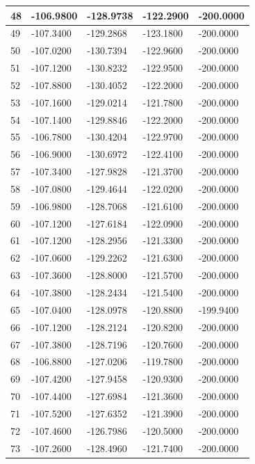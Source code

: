 \begin{longtable}{|l|l|l|l|l|}
48 & -106.9800 & -128.9738 & -122.2900 & -200.0000 \\\hline
49 & -107.3400 & -129.2868 & -123.1800 & -200.0000 \\\hline
50 & -107.0200 & -130.7394 & -122.9600 & -200.0000 \\\hline
51 & -107.1200 & -130.8232 & -122.9500 & -200.0000 \\\hline
52 & -107.8800 & -130.4052 & -122.2000 & -200.0000 \\\hline
53 & -107.1600 & -129.0214 & -121.7800 & -200.0000 \\\hline
54 & -107.1400 & -129.8846 & -122.2000 & -200.0000 \\\hline
55 & -106.7800 & -130.4204 & -122.9700 & -200.0000 \\\hline
56 & -106.9000 & -130.6972 & -122.4100 & -200.0000 \\\hline
57 & -107.3400 & -127.9828 & -121.3700 & -200.0000 \\\hline
58 & -107.0800 & -129.4644 & -122.0200 & -200.0000 \\\hline
59 & -106.9800 & -128.7068 & -121.6100 & -200.0000 \\\hline
60 & -107.1200 & -127.6184 & -122.0900 & -200.0000 \\\hline
61 & -107.1200 & -128.2956 & -121.3300 & -200.0000 \\\hline
62 & -107.0600 & -129.2262 & -121.6300 & -200.0000 \\\hline
63 & -107.3600 & -128.8000 & -121.5700 & -200.0000 \\\hline
64 & -107.3800 & -128.2434 & -121.5400 & -200.0000 \\\hline
65 & -107.0400 & -128.0978 & -120.8800 & -199.9400 \\\hline
66 & -107.1200 & -128.2124 & -120.8200 & -200.0000 \\\hline
67 & -107.3800 & -128.7196 & -120.7600 & -200.0000 \\\hline
68 & -106.8800 & -127.0206 & -119.7800 & -200.0000 \\\hline
69 & -107.4200 & -127.9458 & -120.9300 & -200.0000 \\\hline
70 & -107.4400 & -127.6984 & -121.3600 & -200.0000 \\\hline
71 & -107.5200 & -127.6352 & -121.3900 & -200.0000 \\\hline
72 & -107.4600 & -126.7986 & -120.5000 & -200.0000 \\\hline
73 & -107.2600 & -128.4960 & -121.7400 & -200.0000 \\\hline

\end{longtable}
